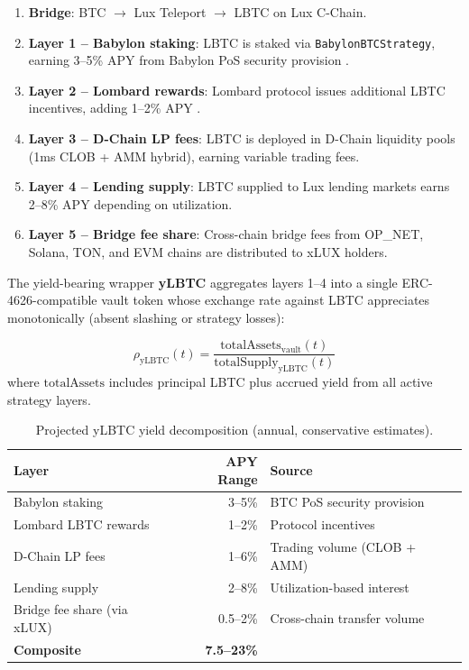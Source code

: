 \begin{enumerate}
    \item \textbf{Bridge}: BTC $\to$ Lux Teleport $\to$ LBTC on Lux C-Chain.
    \item \textbf{Layer 1 -- Babylon staking}: LBTC is staked via \texttt{BabylonBTCStrategy}, earning 3--5\% APY from Babylon PoS security provision \cite{babylon2024}.
    \item \textbf{Layer 2 -- Lombard rewards}: Lombard protocol issues additional LBTC incentives, adding 1--2\% APY \cite{lombard2024}.
    \item \textbf{Layer 3 -- D-Chain LP fees}: LBTC is deployed in D-Chain liquidity pools (1ms CLOB + AMM hybrid), earning variable trading fees.
    \item \textbf{Layer 4 -- Lending supply}: LBTC supplied to Lux lending markets earns 2--8\% APY depending on utilization.
    \item \textbf{Layer 5 -- Bridge fee share}: Cross-chain bridge fees from OP\_NET, Solana, TON, and EVM chains are distributed to xLUX holders.
\end{enumerate}

The yield-bearing wrapper \textbf{yLBTC} aggregates layers 1--4 into a single ERC-4626-compatible vault token whose exchange rate against LBTC appreciates monotonically (absent slashing or strategy losses):

\begin{definition}
\begin{equation}
    \rho_{\text{yLBTC}}(t) = \frac{\text{totalAssets}_{\text{vault}}(t)}{\text{totalSupply}_{\text{yLBTC}}(t)}
\end{equation}
where $\text{totalAssets}$ includes principal LBTC plus accrued yield from all active strategy layers.
\end{definition}

\begin{table}[H]
\centering
\caption{Projected yLBTC yield decomposition (annual, conservative estimates).}
\label{tab:ylbtc_yield}
\begin{tabular}{lrp{5.5cm}}
\toprule
\textbf{Layer} & \textbf{APY Range} & \textbf{Source} \\
\midrule
Babylon staking & 3--5\% & BTC PoS security provision \\
Lombard LBTC rewards & 1--2\% & Protocol incentives \\
D-Chain LP fees & 1--6\% & Trading volume (CLOB + AMM) \\
Lending supply & 2--8\% & Utilization-based interest \\
Bridge fee share (via xLUX) & 0.5--2\% & Cross-chain transfer volume \\
\midrule
\textbf{Composite} & \textbf{7.5--23\%} & \\
\bottomrule
\end{tabular}
\end{table}

